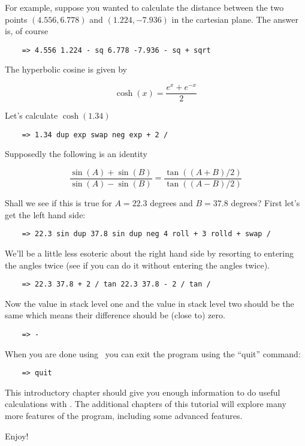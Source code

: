 For example, suppose you wanted to calculate the distance between the two points $(4.556,
6.778)$ and $(1.224, -7.936)$ in the cartesian plane. The answer is, of course

\begin{verbatim}
    => 4.556 1.224 - sq 6.778 -7.936 - sq + sqrt
\end{verbatim}

The hyperbolic cosine is given by

\begin{displaymath}
     \cosh (x) = \frac{ e^{x} + e^{-x} }{ 2 }
\end{displaymath}

Let's calculate $\cosh(1.34)$

\begin{verbatim}
    => 1.34 dup exp swap neg exp + 2 /
\end{verbatim}

Supposedly the following is an identity

\begin{displaymath}
     \frac { \sin(A) + \sin(B) }{ \sin(A) - \sin(B) } =
       \frac { \tan((A+B)/2) }{ \tan((A-B)/2) }
\end{displaymath}

Shall we see if this is true for $A = 22.3$ degrees and $B = 37.8$ degrees? First let's get the
left hand side:

\begin{verbatim}
    => 22.3 sin dup 37.8 sin dup neg 4 roll + 3 rolld + swap /
\end{verbatim}

We'll be a little less esoteric about the right hand side by resorting to entering the angles
twice (see if you can do it without entering the angles twice).

\begin{verbatim}
    => 22.3 37.8 + 2 / tan 22.3 37.8 - 2 / tan /
\end{verbatim}

Now the value in stack level one and the value in stack level two should be the same which means
their difference should be (close to) zero.

\begin{verbatim}
    => -
\end{verbatim}

When you are done using \CLAC\ you can exit the program using the ``quit'' command:

\begin{verbatim}
    => quit
\end{verbatim}

This introductory chapter should give you enough information to do useful calculations with \CLAC.
The additional chapters of this tutorial will explore many more features of the program, including
some advanced features.

Enjoy!
